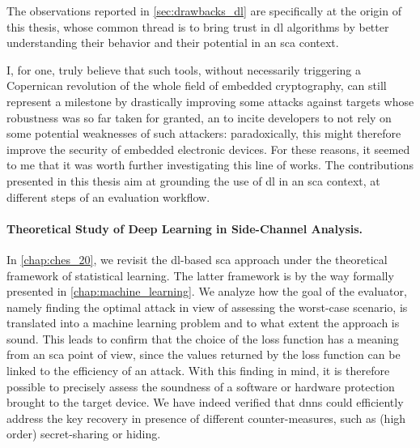 The observations reported in \autoref{sec:drawbacks_dl} are specifically at the origin of this thesis, whose common thread is to bring trust in \gls{dl} algorithms by better understanding their behavior and their potential in an \gls{sca} context.

I, for one, truly believe that such tools, without necessarily triggering a Copernican revolution of the whole field of embedded \gls{cryptography}, can still represent a milestone by drastically improving some attacks against targets whose robustness was so far taken for granted, an to incite developers to not rely on some potential weaknesses of such attackers: paradoxically, this might therefore improve the security of embedded electronic devices.
For these reasons, it seemed to me that it was worth further investigating this line of works.
The contributions presented in this thesis aim at grounding the use of \gls{dl} in an \gls{sca} context, at different steps of an evaluation workflow.


\paragraph{Theoretical Study of Deep Learning in Side-Channel Analysis.}
In \autoref{chap:ches_20}, we revisit the \gls{dl}-based \gls{sca} approach under the theoretical framework of statistical learning.
The latter framework is by the way formally presented in \autoref{chap:machine_learning}.
We analyze how the goal of the evaluator, namely finding the optimal attack in view of assessing the worst-case scenario, is translated into a machine learning problem and to what extent the approach is sound.
This leads to confirm that the choice of the loss function has a meaning from an \gls{sca} point of view, since the values returned by the loss function can be linked to the efficiency of an attack.
With this finding in mind, it is therefore possible to precisely assess the soundness of a software or hardware protection brought to the target device.
We have indeed verified that \glspl{dnn} could efficiently address the key recovery in presence of different counter-measures, such as (high order) secret-sharing or hiding.

